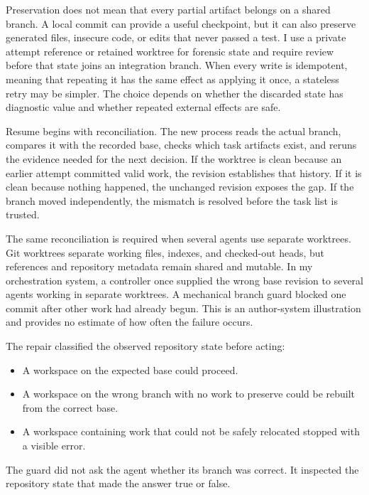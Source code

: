 Preservation does not mean that every partial artifact belongs on a shared branch. A local commit can provide a useful checkpoint, but it can also preserve generated files, insecure code, or edits that never passed a test. I use a private attempt reference or retained worktree for forensic state and require review before that state joins an integration branch. When every write is idempotent, meaning that repeating it has the same effect as applying it once, a stateless retry may be simpler. The choice depends on whether the discarded state has diagnostic value and whether repeated external effects are safe.

Resume begins with reconciliation. The new process reads the actual branch, compares it with the recorded base, checks which task artifacts exist, and reruns the evidence needed for the next decision. If the worktree is clean because an earlier attempt committed valid work, the revision establishes that history. If it is clean because nothing happened, the unchanged revision exposes the gap. If the branch moved independently, the mismatch is resolved before the task list is trusted.

The same reconciliation is required when several agents use separate worktrees. Git worktrees separate working files, indexes, and checked-out heads, but references and repository metadata remain shared and mutable. In my orchestration system, a controller once supplied the wrong base revision to several agents working in separate worktrees. A mechanical branch guard blocked one commit after other work had already begun. This is an author-system illustration and provides no estimate of how often the failure occurs.


The repair classified the observed repository state before acting:

\begin{itemize}
\tightlist
\item
  A workspace on the expected base could proceed.
\item
  A workspace on the wrong branch with no work to preserve could be rebuilt from the correct base.
\item
  A workspace containing work that could not be safely relocated stopped with a visible error.
\end{itemize}

The guard did not ask the agent whether its branch was correct. It inspected the repository state that made the answer true or false.

